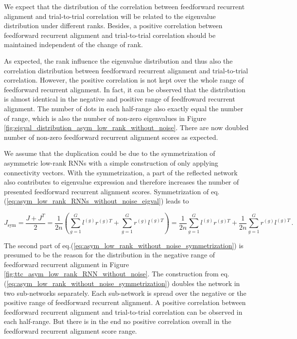 \documentclass[11pt]{article}
\begin{document}
	\vspace{0.5cm}
	We expect that the distribution of the correlation between feedforward recurrent alignment and trial-to-trial correlation will be related to the eigenvalue distribution under different ranks. Besides, a positive correlation between feedforward recurrent alignment and trial-to-trial correlation should be maintained independent of the change of rank.
	
	As expected, the rank influence the eigenvalue distribution and thus also the correlation distribution between feedforward recurrent alignment and trial-to-trial correlation. However, the positive correlation is not kept over the whole range of feedforward recurrent alignment. In fact, it can be observed that the distribution is almost identical in the negative and positive range of feedfroward recurrent alignment. The number of dots in each half-range also exactly equal the number of range, which is also the number of non-zero eigenvalues in Figure \ref{fig:eigval_distribution_asym_low_rank_without_noise}. There are now doubled number of non-zero feedforward recurrent alignment scores as expected. 
		
	We assume that the duplication could be due to the symmetrization of asymmetric low-rank RNNs with a simple construction of only applying connectivity vectors. With the symmetrization, a part of the reflected network also contributes to eigenvalue expression and therefore increases the number of presented feedforward recurrent alignment scores. Symmetrization of eq.(\ref{eq:asym_low_rank_RNNs_without_noise_eigval}) leads to
	
		\begin{equation} \label{eq:asym_low_rank_without_noise_symmetrization}
			J_{\text{sym}} = \frac{J + J^T}{2} = \frac{1}{2n} \left( \sum_{g=1}^{G} l^{(g)} r^{(g)T} + \sum_{g=1}^{G} r^{(g)} l^{(g)T}\right) = \frac{1}{2n} \sum_{g=1}^{G} l^{(g)} r^{(g)T} + \frac{1}{2n} \sum_{g=1}^{G} r^{(g)} l^{(g)T} \, .
		\end{equation}
	
	
	The second part of eq.(\ref{eq:asym_low_rank_without_noise_symmetrization}) is presumed to be the reason for the distribution in the negative range of feedforward recurrent alignment in Figure \ref{fig:ttc_asym_low_rank_RNN_without_noise}. The construction from eq.(\ref{eq:asym_low_rank_without_noise_symmetrization}) doubles the network in two sub-networks separately. Each sub-network is spread over the negative or the positive range of feedforward recurrent alignment. A positive correlation between feedforward recurrent alignment and trial-to-trial correlation can be observed in each half-range. But there is in the end no positive correlation overall in the feedforward recurrent alignment score range. 
	
\end{document}
